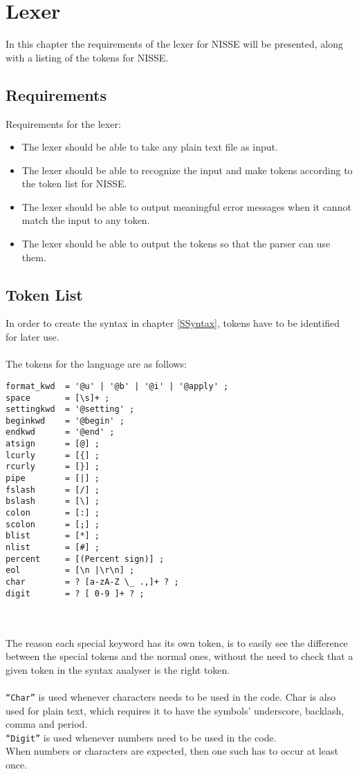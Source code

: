 \chapter{Lexer}
In this chapter the requirements of the lexer for NISSE will be presented, along with a listing of the tokens for NISSE.
\section{Requirements}
Requirements for the lexer:
\begin{itemize}
		\item The lexer should be able to take any plain text file as input.
		\item The lexer should be able to recognize the input and make tokens according to the token list for NISSE.
		\item The lexer should be able to output meaningful error messages when it cannot match the input to any token.
		\item The lexer should be able to output the tokens so that the parser can use them.
\end{itemize}

\newpage
\section{Token List}
In order to create the syntax in chapter \ref{SSyntax}, tokens have to be identified for later use.
\\ \\
The tokens for the language are as follows:

\begin{lstlisting}[frame=single]
format_kwd  = '@u' | '@b' | '@i' | '@apply' ;
space       = [\s]+ ;
settingkwd  = '@setting' ;
beginkwd    = '@begin' ;
endkwd      = '@end' ;
atsign      = [@] ;
lcurly      = [{] ;
rcurly      = [}] ;
pipe        = [|] ;
fslash      = [/] ;
bslash      = [\] ;
colon       = [:] ;
scolon      = [;] ;
blist       = [*] ;
nlist       = [#] ;
percent     = [(Percent sign)] ;
eol         = [\n |\r\n] ;
char        = ? [a-zA-Z \_ .,]+ ? ;
digit       = ? [ 0-9 ]+ ? ;
\end{lstlisting}

\\ \\
The reason each special keyword has its own token, is to easily see the difference between the special tokens and the normal ones, without the need to check that a given token in the syntax analyser is the right token.
\\ \\
\texttt{``Char''} is used whenever characters needs to be used in the code. Char is also used for plain text, which requires it to have the symbols' underscore, backlash, comma and period. \\
\texttt{``Digit''} is used whenever numbers need to be used in the code. \\
When numbers or characters are expected, then one such has to occur at least once.
